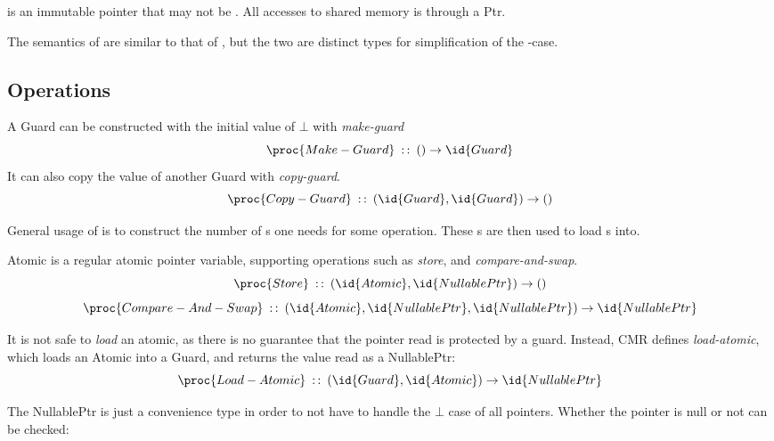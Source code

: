 \begin{definition}
   is an immutable pointer that may not be \nullptr. All accesses to shared memory is
  through a Ptr.
\end{definition}
The semantics of  are similar to that of , but the two are distinct types
for simplification of the \nullptr-case.


\subsection{Operations}

A Guard can be constructed with the initial value of $\bot$ with \emph{make-guard}
\begin{equation}\label{eq:make-guard}
  \proc{Make-Guard}\typeof{} () \to \id{Guard}
\end{equation}
It can also copy the value of another Guard with \emph{copy-guard}.
\begin{equation}\label{eq:copy-guard}
  \proc{Copy-Guard}\typeof{} (\id{Guard}, \id{Guard}) \to ()
\end{equation}

General usage of  is to construct the number of s one needs for some operation.
These s are then used to load s into.

Atomic is a regular atomic pointer variable, supporting operations such as \emph{store}, and
\emph{compare-and-swap}.
\begin{equation}\label{eq:atomic-store}
  \proc{Store}\typeof{} (\id{Atomic}, \id{NullablePtr}) \to ()
\end{equation}
\begin{equation}\label{eq:atomic-cas}
  \proc{Compare-And-Swap}\typeof (\id{Atomic}, \id{NullablePtr}, \id{NullablePtr}) \to
  \id{NullablePtr}
\end{equation}

It is not safe to \emph{load} an atomic, as there is no guarantee that the
pointer read is protected by a guard. Instead, CMR defines \emph{load-atomic}, which loads an
Atomic into a Guard, and returns the value read as a NullablePtr:
\begin{equation}\label{eq:load-atomic}
  \proc{Load-Atomic}\typeof{} (\id{Guard}, \id{Atomic}) \to \id{NullablePtr}
\end{equation}

The NullablePtr is just a convenience type in order to not have to handle the $\bot$ case of all
pointers. Whether the pointer is null or not can be checked:

